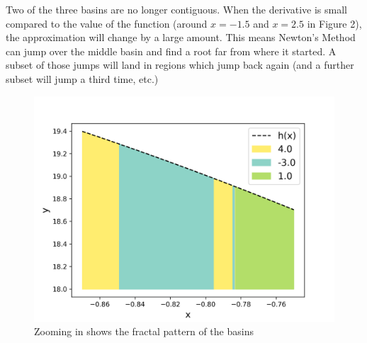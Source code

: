 \documentclass[10pt,a4paper]{article}
\begin{document}
		Two of the three basins are no longer contiguous. When the derivative is small compared to the value of the function (around $x=-1.5$ and $x=2.5$ in Figure 2), the approximation will change by a large amount. This means Newton's Method can jump over the middle basin and find a root far from where it started. A subset of those jumps will land in regions which jump back again (and a further subset will jump a third time, etc.)
		\begin{figure}[H]
			\centering
			\caption{Zooming in shows the fractal pattern of the basins}
			\includegraphics[scale=0.5]{figure4}
		\end{figure}
	
\end{document}
